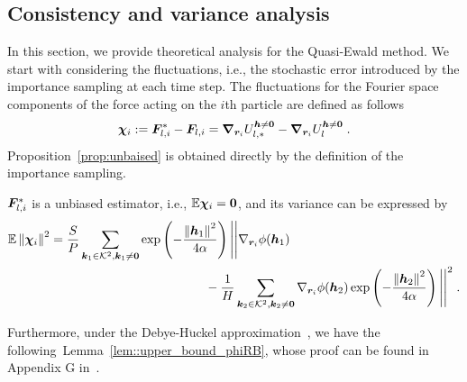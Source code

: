 \subsection{Consistency and variance analysis}
In this section, we provide theoretical analysis for the Quasi-Ewald method. We start with considering the fluctuations, i.e., the stochastic error introduced by the importance sampling at each time step.
The fluctuations for the Fourier space components of   the force acting on the $i$th particle are defined as follows 
\begin{equation}\label{eq::xichi}
    \boldsymbol{\chi}_{i} :=\bm{F}_{l,i}^*-\bm{F}_{l,i}=\boldsymbol{\nabla}_{\boldsymbol{r}_i} U_{l,\ast}^{\boldsymbol{h}\neq \bm{0}}-\boldsymbol{\nabla}_{\boldsymbol{r}_i} U_{l}^{\boldsymbol{h}\neq \bm{0}}\;.
\end{equation}
Proposition~\ref{prop:unbaised} is obtained directly by the definition of the importance sampling.
\begin{prop}\label{prop:unbaised}
	  $\bm{F}_{l,i}^*$ is a  unbiased estimator, i.e.,  $\mathbb{E} \boldsymbol{\chi}_{i} = \bm 0$, and its variance  can be expressed by
\begin{align*}
		\mathbb{E}\left\lVert\boldsymbol{\chi}_{i}\right\rVert^2&=\frac{S}{P}\sum_{\bm{k}_1\in\mathcal{K}^2, \bm{k}_1\neq \bm{0}}\exp\left(-\frac{\left\lVert\boldsymbol{h}_1\right\rVert^2}{4\alpha}\right)\Bigg|\Bigg|\nabla_{\bm{r}_i}\phi(\boldsymbol{h}_1)\\
        &~~~~~~~~~~~~~~~~~~~~~~~~~~~~~~~~~~~~~-\frac{1}{H} \sum_{\bm{k}_2\in\mathcal{K}^2, \bm{k}_2\neq \bm{0}}\nabla_{\bm{r}_i}\phi(\boldsymbol{h}_2)\exp\left(-\frac{\left\lVert\boldsymbol{h}_2\right\rVert^2}{4\alpha}\right)\Bigg|\Bigg|^2\;.
\end{align*}
\end{prop}
Furthermore, under the Debye-H$\ddot{\text{u}}$ckel approximation~\cite{levin2002electrostatic}, we have  the following~Lemma~\ref{lem::upper_bound_phiRB}, whose proof can be found in Appendix G in~\cite{gan2024fast}.

